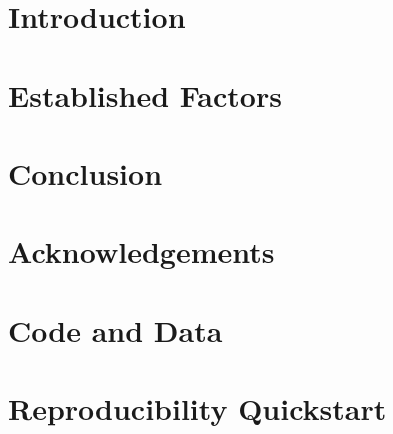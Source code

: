 \documentclass[12pt, letterpaper]{article}
\begin{document}

\newpage
\tableofcontents
\newpage

\section{Introduction}


\section{Established Factors}



\section{Conclusion}


\section*{Acknowledgements}


\appendix

\section{Code and Data}


\section{Reproducibility Quickstart}




\end{document}
